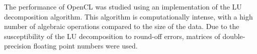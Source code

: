 \par{The performance of OpenCL was studied using an implementation of the LU decomposition algorithm. 
    This algorithm is computationally intense, with a high number of algebraic operations compared to 
    the size of the data. Due to the susceptibility of the LU decomposition to round-off errors, matrices 
    of double-precision floating point numbers were used.}
